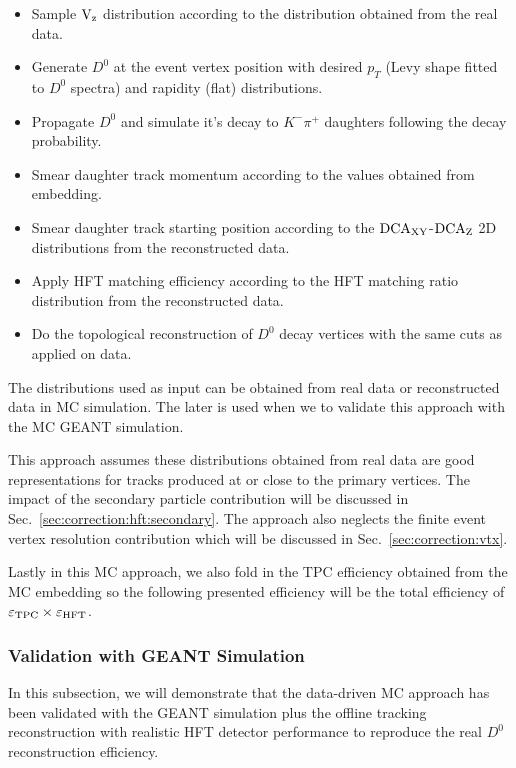 \documentclass[%
 reprint,	
 amsmath,amssymb,
 aps,
 prc,
]{revtex4-1}
\begin{document}
\begin{itemize}
\item Sample $\textup{V}_\textup{z}$ distribution according to the distribution obtained from the real data.
\item Generate $D^0$ at the event vertex position with desired $p_T$ (Levy shape fitted to $D^0$ spectra) and rapidity (flat) distributions.
\item Propagate $D^0$ and simulate it's decay to $K^-\pi^+$ daughters following the decay probability.
\item Smear daughter track momentum according to the values obtained from embedding.
\item Smear daughter track starting position according to the $\textup{DCA}_{\textup{XY}}$-$\textup{DCA}_\textup{Z}$ 2D distributions from the reconstructed data.
\item Apply HFT matching efficiency according to the HFT matching ratio distribution from the reconstructed data.
\item Do the topological reconstruction of $D^0$ decay vertices with the same cuts as applied on data.
\end{itemize}
The distributions used as input can be obtained from real data or reconstructed data in MC simulation. The later is used when we to validate this approach with the MC GEANT simulation. 

This approach assumes these distributions obtained from real data are good representations for tracks produced at or close to the primary vertices. The impact of the secondary particle contribution will be discussed in Sec.~\ref{sec:correction:hft:secondary}. The approach also neglects the finite event vertex resolution contribution which will be discussed in Sec.~\ref{sec:correction:vtx}.

Lastly in this MC approach, we also fold in the TPC efficiency obtained from the MC embedding so the following presented efficiency will be the total efficiency of $\varepsilon_{\rm TPC}\times\varepsilon_{\rm HFT}$.

\subsubsection{\label{sec:correction:hft:validation}Validation with GEANT Simulation}

In this subsection, we will demonstrate that the data-driven MC approach has been validated with the GEANT simulation plus the offline tracking reconstruction with realistic HFT detector performance to reproduce the real $D^0$ reconstruction efficiency.
\end{document}
